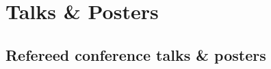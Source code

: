 \documentclass[letterpaper]{article}
\begin{document}





\section*{Talks \& Posters}

\subsection*{Refereed conference talks \& posters}
\end{document}
